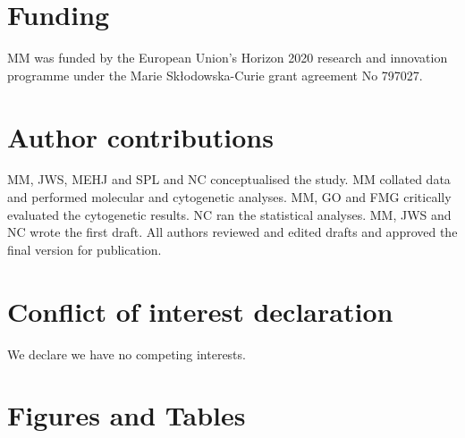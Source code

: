 \documentclass[a4paper, 12pt]{article}
\begin{document}
\section{Funding}
MM was funded by the European Union’s Horizon 2020 research and innovation programme under the Marie Sk\l{}odowska-Curie grant agreement No 797027.

\section{Author contributions}
MM, JWS, MEHJ and SPL and NC conceptualised the study. MM collated data and performed molecular and cytogenetic analyses. MM, GO and FMG critically evaluated the cytogenetic results. NC ran the statistical analyses. MM, JWS and NC wrote the first draft. All authors reviewed and edited drafts and approved the final version for publication.

\section{Conflict of interest declaration}
We declare we have no competing interests.




\section{Figures and Tables}


\end{document}

